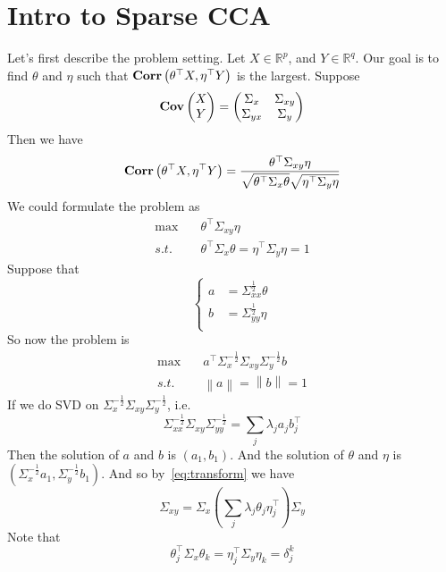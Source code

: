 \documentclass[12pt]{article}
\newcommand{\Cov}{{\bf Cov}}
\newcommand{\Cor}{{\bf Corr}}
\newcommand{\lam}{\lambda}
\newcommand{\R}{\mathbb R}
\newcommand{\Y}{{\boldsymbol Y}}
\newcommand{\bra}[1]{\left(#1\right)}
\newcommand{\norm}[1]{\left\|#1\right\|}
\def\beq{\begin{equation}}
\def\eeq{\end{equation}}
\def\bal{\begin{aligned}}
\def\eal{\end{aligned}}
\def\beqal{\begin{equation}\begin{aligned}}
\def\eeqal{\end{aligned}\end{equation}}
\begin{document}
	\MakeScribeTop
\section{Intro to Sparse CCA}
Let's first describe the problem setting. Let $X\in \R^p$, and $Y\in \R^q$. Our goal is to find $\theta$ and $\eta$ such that $\Cor\bra{\theta^\top X, \eta^\top Y}$ is the largest. Suppose
\beq
\Cov\begin{pmatrix}
X\\Y
\end{pmatrix}=
\begin{pmatrix}
\Sigma_{x}&\Sigma_{xy}\\
\Sigma_{yx}&\Sigma_{y}\\
\end{pmatrix}
\eeq
Then we have
\beq
\Cor\bra{\theta^\top X, \eta^\top Y}=\frac{\theta^\top \Sigma_{xy}\eta}{\sqrt{\theta^\top \Sigma_{x}\theta}\sqrt{\eta^\top \Sigma_{y}\eta}}
\eeq
We could formulate the problem as
\beqal
\max\quad& \theta^\top \Sigma_{xy}\eta\\
s.t.\quad& \theta^\top \Sigma_{x}\theta=\eta^\top \Sigma_{y}\eta=1
\eeqal
Suppose that
\beq\label{eq:transform}
\left\{
\bal
a&=\Sigma_{xx}^{\frac{1}{2}}\theta\\
b&=\Sigma_{yy}^{\frac{1}{2}}\eta\\
\eal
\right.
\eeq
So now the problem is
\beqal
\max\quad& a^\top\Sigma_{x}^{-\frac{1}{2}} \Sigma_{xy}\Sigma_{y}^{-\frac{1}{2}}b\\
s.t.\quad& \norm{a}=\norm{b}=1
\eeqal
If we do SVD on $\Sigma_{x}^{-\frac{1}{2}} \Sigma_{xy}\Sigma_{y}^{-\frac{1}{2}}$, i.e.
\beq
\Sigma_{xx}^{-\frac{1}{2}} \Sigma_{xy}\Sigma_{yy}^{-\frac{1}{2}}=\sum_j \lam_ja_jb_j^\top
\eeq
Then the solution of $a$ and $b$ is $(a_1,b_1)$. And the solution of $\theta$ and $\eta$ is $(\Sigma_{x}^{-\frac{1}{2}}a_1,\Sigma_{y}^{-\frac{1}{2}}b_1)$. And so by~\ref{eq:transform} we have
\beq
\Sigma_{xy}=\Sigma_{x}\bra{\sum_j \lam_j\theta_j\eta_j^\top}\Sigma_{y}
\eeq
Note that 
\beq
\theta_j^\top\Sigma_{x}\theta_k=\eta_j^\top\Sigma_{y}\eta_k=\delta_j^k
\eeq
\end{document}

